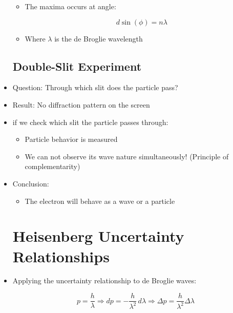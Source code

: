 \begin{itemize}
\begin{itemize}
      \item The maxima occurs at angle:

        $$\boxed{d\sin(\phi)=n\lambda}$$

      \item Where $\lambda$ is the de Broglie wavelength

    \end{itemize}

    \subsection{Double-Slit Experiment}

  \item Question: Through which slit does the particle pass?

  \item Result: No diffraction pattern on the screen

  \item if we check which slit the particle passes through:

    \begin{itemize}

      \item Particle behavior is measured

      \item We can not observe its wave nature simultaneously! (Principle of complementarity)

    \end{itemize}

  \item Conclusion: 

    \begin{itemize}

      \item The electron will behave as a wave or a particle

    \end{itemize}

    \section{Heisenberg Uncertainty Relationships}

  \item Applying the uncertainty relationship to de Broglie waves:

    $$p=\frac{h}{\lambda}\Rightarrow dp=-\frac{h}{\lambda^2}\,d\lambda\Rightarrow \Delta p = \frac{h}{\lambda^2}\Delta\lambda$$


\end{itemize}
